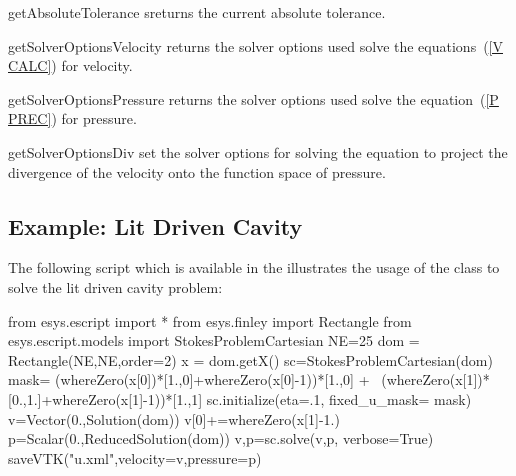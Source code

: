 \begin{methoddesc}[StokesProblemCartesian]{getAbsoluteTolerance}{}
sreturns the current absolute tolerance.
\end{methoddesc}

\begin{methoddesc}[StokesProblemCartesian]{getSolverOptionsVelocity}{}
returns the solver options used  solve the equations~(\ref{V CALC}) for velocity.
\end{methoddesc}

\begin{methoddesc}[StokesProblemCartesian]{getSolverOptionsPressure}{}
returns the solver options used  solve the equation~(\ref{P PREC}) for pressure.
\end{methoddesc}

\begin{methoddesc}[StokesProblemCartesian]{getSolverOptionsDiv}{}
set the solver options for solving the equation to project the divergence of the velocity onto the function space of pressure.
\end{methoddesc}


\subsection{Example: Lit Driven Cavity}
 The following script  
 which is available in the \ExampleDirectory
illustrates the usage of the  class to solve
the lit driven cavity problem:
\begin{python}
from esys.escript import *
from esys.finley import Rectangle
from esys.escript.models import StokesProblemCartesian
NE=25
dom = Rectangle(NE,NE,order=2)
x = dom.getX()
sc=StokesProblemCartesian(dom)
mask= (whereZero(x[0])*[1.,0]+whereZero(x[0]-1))*[1.,0] + \
      (whereZero(x[1])*[0.,1.]+whereZero(x[1]-1))*[1.,1]
sc.initialize(eta=.1, fixed_u_mask= mask)
v=Vector(0.,Solution(dom))
v[0]+=whereZero(x[1]-1.)
p=Scalar(0.,ReducedSolution(dom))
v,p=sc.solve(v,p, verbose=True)
saveVTK("u.xml",velocity=v,pressure=p)
\end{python}
